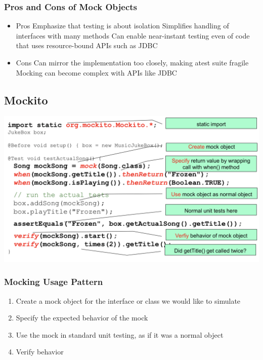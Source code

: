 \documentclass[10pt]{article}
\begin{document}
    \subsubsection{Pros and Cons of Mock Objects}
    \begin{itemize}
    	\item Pros
			\subitem Emphasize that testing is about isolation
			\subitem Simplifies handling of interfaces with many methods
			\subitem Can enable near-instant testing even of code that uses resource-bound APIs such as JDBC
		\item Cons
			\subitem Can mirror the implementation too closely, making atest suite fragile
			\subitem Mocking can become complex with APIs like JDBC
    \end{itemize}
    
    \subsection{Mockito}
    \begin{center}
    	\includegraphics[scale=0.4]{assets/mockito.png}
    \end{center}
    \subsubsection{Mocking Usage Pattern}
    \begin{enumerate}
    	\item Create a mock object for the interface or class we would like to simulate
    	\item Specify the expected behavior of the mock
    	\item Use the mock in standard unit testing, as if it was a normal object
    	\item Verify behavior
    \end{enumerate}
    
\end{document}
